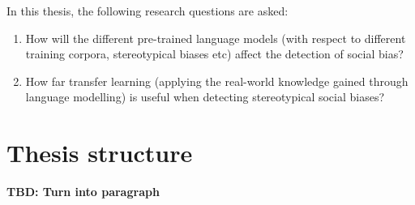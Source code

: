 In this thesis, the following research questions are asked:
\begin{enumerate}
    \item How will the different pre-trained language models (with respect to different training corpora, stereotypical biases etc) affect the detection of social bias?
    \item How far transfer learning (applying the real-world knowledge gained through language modelling) is useful when detecting stereotypical social biases?
\end{enumerate}

\section{Thesis structure}

\textbf{TBD: Turn into paragraph}
